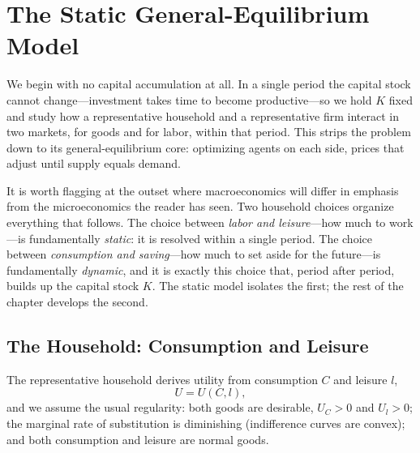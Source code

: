 \section{The Static General-Equilibrium Model}

We begin with no capital accumulation at all. In a single period the capital stock cannot change---investment takes time to become productive---so we hold $K$ fixed and study how a representative household and a representative firm interact in two markets, for goods and for labor, within that period. This strips the problem down to its general-equilibrium core: optimizing agents on each side, prices that adjust until supply equals demand.


It is worth flagging at the outset where macroeconomics will differ in emphasis from the microeconomics the reader has seen. Two household choices organize everything that follows. The choice between \emph{labor and leisure}---how much to work---is fundamentally \emph{static}: it is resolved within a single period. The choice between \emph{consumption and saving}---how much to set aside for the future---is fundamentally \emph{dynamic}, and it is exactly this choice that, period after period, builds up the capital stock $K$. The static model isolates the first; the rest of the chapter develops the second.

\subsection{The Household: Consumption and Leisure}

The representative household derives utility from consumption $C$ and leisure $l$,
\[
U = U(C, l),
\]
and we assume the usual regularity: both goods are desirable, $U_C > 0$ and $U_l > 0$; the marginal rate of substitution is diminishing (indifference curves are convex); and both consumption and leisure are normal goods.


